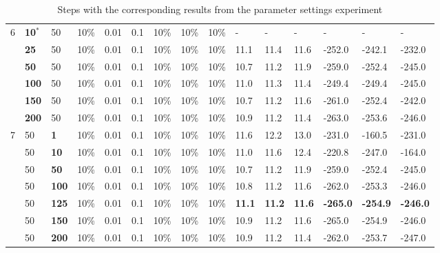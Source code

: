 \begin{table}
\begin{tabular}{|l|l|l|l|l|l|l|l|l||l|l|l|l|l|l|}
    \hline
    6 & \textbf{10$^*$} & 50 & 10\% & 0.01 & 0.1 & 10\% & 10\% & 10\% & - & - & - & - & - & - \\
    ~ & \textbf{25} & 50 & 10\% & 0.01 & 0.1 & 10\% & 10\% & 10\% & 11.1 & 11.4 & 11.6 & -252.0 & -242.1 & -232.0 \\
    ~ & \textbf{50} & 50 & 10\% & 0.01 & 0.1 & 10\% & 10\% & 10\% & 10.7 & 11.2 & 11.9 & -259.0 & -252.4 & -245.0 \\
    ~ & \textbf{100} & 50 & 10\% & 0.01 & 0.1 & 10\% & 10\% & 10\% & 11.0 & 11.3 & 11.4 & -249.4 & -249.4 & -245.0 \\
    ~ & \textbf{150} & 50 & 10\% & 0.01 & 0.1 & 10\% & 10\% & 10\% & 10.7 & 11.2 & 11.6 & -261.0 & -252.4 & -242.0 \\
    ~ & \textbf{200} & 50 & 10\% & 0.01 & 0.1 & 10\% & 10\% & 10\% & 10.9 & 11.2 & 11.4 & -263.0 & -253.6 & -246.0 \\
    \hline
    7 & 50 & \textbf{1} & 10\% & 0.01 & 0.1 & 10\% & 10\% & 10\% & 11.6 & 12.2 & 13.0 & -231.0 & -160.5 & -231.0  \\
    ~ & 50 & \textbf{10} & 10\% & 0.01 & 0.1 & 10\% & 10\% & 10\% & 11.0 & 11.6 & 12.4 & -220.8 & -247.0 & -164.0  \\
    ~ & 50 & \textbf{50} & 10\% & 0.01 & 0.1 & 10\% & 10\% & 10\% & 10.7 & 11.2 & 11.9 & -259.0 & -252.4 & -245.0 \\
    ~ & 50 & \textbf{100} & 10\% & 0.01 & 0.1 & 10\% & 10\% & 10\% & 10.8 & 11.2 & 11.6 & -262.0 & -253.3 & -246.0  \\
    ~ & 50 & \textbf{125} & 10\% & 0.01 & 0.1 & 10\% & 10\% & 10\% & \textbf{11.1} & \textbf{11.2} & \textbf{11.6} & \textbf{-265.0} & \textbf{-254.9} & \textbf{-246.0}  \\
    ~ & 50 & \textbf{150} & 10\% & 0.01 & 0.1 & 10\% & 10\% & 10\% & 10.9 & 11.2 & 11.6 & -265.0 & -254.9 & -246.0  \\
    ~ & 50 & \textbf{200} & 10\% & 0.01 & 0.1 & 10\% & 10\% & 10\% & 10.9 & 11.2 & 11.4 & -262.0 & -253.7 & -247.0  \\
    \hline
    \end{tabular}
    \caption {Steps with the corresponding results from the parameter settings experiment} 
    \begin{itemize}[noitemsep]

\end{itemize}
\end{table}
